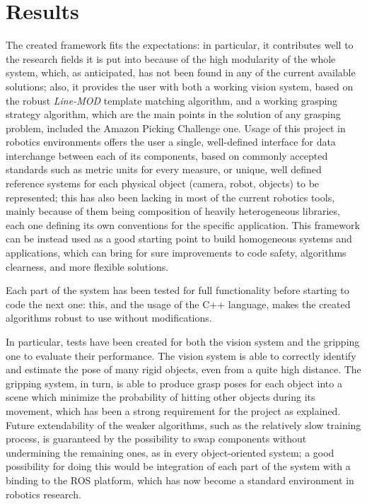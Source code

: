 \documentclass[a4paper,11pt]{article}
\begin{document}
\section*{Results}
The created framework fits the expectations: in particular, it contributes well
to the research fields it is put into because of the high modularity of the
whole system, which, as anticipated, has not been found in any of the
current available solutions; also, it provides the user with both a
working vision system, based on the robust \emph{Line-MOD} template matching
algorithm,
and a working grasping strategy algorithm, which
are the main points in the solution of any grasping problem, included
the Amazon Picking Challenge one. Usage of this project in robotics environments
offers the user a single, well-defined interface for data interchange
between each of its components,
based on commonly accepted standards such as metric units for every
measure, or unique, well defined reference systems for each physical
object (camera, robot, objects) to be represented; this has also been
lacking in most of the current robotics tools, mainly because of them
being composition of heavily heterogeneous libraries, each one
defining its own conventions for the specific application. This
framework can be instead used as a good starting point to build
homogeneous systems and applications, which can bring for sure
improvements to code safety, algorithms clearness, and more flexible solutions.

Each part of the system has been tested for full functionality before
starting to code the next one: this, and the usage of the C++
language, makes the created algorithms robust to use without modifications.

In particular, tests have been created for both the vision system and
the gripping one to evaluate their performance. The vision system is able to correctly
identify and estimate the pose of many rigid objects, even from a
quite high distance. The gripping system, in turn, is able to produce grasp
poses for each object into a scene which minimize the probability of hitting other
objects during its movement, which has been a strong requirement for
the project as explained. Future extendability of the weaker
algorithms, such as the relatively slow training process, is
guaranteed by the possibility to swap components without undermining
the remaining ones, as in every object-oriented system; a good
possibility for doing this would be integration of each part of the
system with a binding to the ROS platform, which has now become a
standard environment in robotics research.
\end{document}
